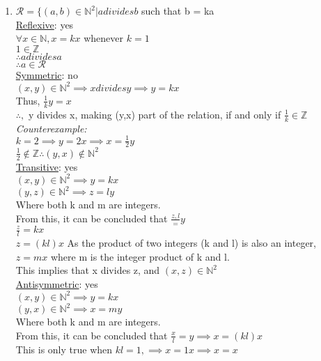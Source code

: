 \documentclass{article}
\theoremstyle{definition}
\begin{document}
\begin{enumerate}[label = \alph*)]
\begin{enumerate}
        \item
        $\mathcal{R} = \{(a, b) \in \mathbb{N}^2 | a divides b$ such that b = ka\\
        \underline{Reflexive}: yes\\
            $\forall x \in \mathbb{N}, x = kx$ whenever $k=1$\\
            $1\in \mathbb{Z}$\\
            $\therefore a divides a$\\
            $\therefore a \in \mathcal{R}$\\
        \underline{Symmetric}: no\\
            $(x, y) \in \mathbb{N}^2 \implies x divides y \implies y=kx$\\
            Thus, $\frac{1}{k}y = x$\\
            $\therefore,$ y divides x, making (y,x) part of the relation, if and only if $\frac{1}{k}\in \mathbb{Z}$\\
            \textit{Counterexample:}\\
            $k=2 \implies y = 2x \implies x = \frac{1}{2}y$\\
            $\frac{1}{2}\notin \mathbb{Z} \therefore (y,x) \notin \mathbb{N}^2$\\
        \underline{Transitive}: yes\\
        $(x, y) \in \mathbb{N}^2 \implies y = kx$\\
        $(y,z) \in \mathbb{N}^2 \implies z=ly$\\
        Where both k and m are integers.\\
        From this, it can be concluded that $\frac{z, l} = y$\\ $\frac{z}{l}=kx$\\
        $z=(kl)x$
        As the product of two integers (k and l) is also an integer, $z=mx$ where m is the integer product of k and l.\\
        This implies that x divides z, and $(x, z) \in \mathbb{N}^2$\\
        \underline{Antisymmetric}: yes\\
        $(x, y) \in \mathbb{N}^2 \implies y = kx$\\
        $(y,x) \in \mathbb{N}^2 \implies x=my$\\
        Where both k and m are integers.\\
        From this, it can be concluded that $\frac{x}{l}=y \implies x=(kl)x$\\
        This is only true when $kl=1, \implies x = 1x \implies x=x$\\

\end{enumerate}
\end{enumerate}
\end{document}
